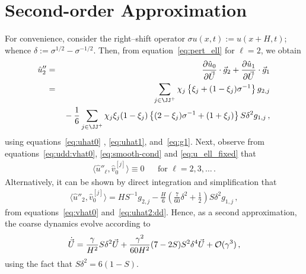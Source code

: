 \documentclass[12pt,a5paper]{article}
\begin{document}
\section{Second-order Approximation}
For convenience, consider the right--shift operator $\sigma u(x,t) := u(x+H,t)$;
 whence $\delta:=\sigma^{{1}/{2}}-\sigma^{-{1}/{2}}$.
Then, from equation~\eqref{eq:pert_ell} for $\ell=2$, we obtain
\begin{eqnarray}
  \hat{u}''_2 & = & \D{\vec U}{\hat{u}_0}\cdot{\vec g}_{2}+\D{\vec U}{\hat{u}_1}\cdot{\vec g}_{1}
\nonumber\\
& = & \sum_{j\in\JJ^+}\chi_j\left\{\xi_j+(1-\xi_j)\sigma^{-1}\right\}g_{2,j}
\nonumber\\
&& {}-\frac{1}{6}\sum_{j\in\JJ^+}\chi_j\xi_j(1-\xi_j)\left\{
(2-\xi_j)\sigma^{-1}+(1+\xi_j)
\right\}S\delta^2g_{1,j}\,,
\label{eq:uhat2:dd}
\end{eqnarray}
using equations~\eqref{eq:uhat0} , \eqref{eq:uhat1}, and~\eqref{eq:g1}.
Next, observe 
from equations~\eqref{eq:udd:vhat0}, \eqref{eq:smooth-cond} and \eqref{eq:u_ell_fixed} that
\begin{eqnarray}
\langle\hat{u}''_\ell,\hat{v}_0^{[j]}\rangle\equiv0 && \mbox{for }\ell=2,3,\ldots\,.
\end{eqnarray}
Alternatively, it can be shown by direct integration and simplification that
\begin{eqnarray}
\langle\hat{u}''_2,\hat{v}_0^{[j]}\rangle = HS^{-1}g_{2,j}-\frac{H}{6}\left(\frac{7}{60}\delta^2+\frac{1}{2}\right)S\delta^2g_{1,j}\,,
\end{eqnarray}
from equations~\eqref{eq:vhat0} and~\eqref{eq:uhat2:dd}.
Hence, as a second approximation, the coarse dynamics evolve according to
\begin{eqnarray}
	\dot{\vec U} = \frac{\gamma}{H^2}S\delta^2\vec U 
+ \frac{\gamma^2}{60H^2}(7-2S)S^2\delta^4\vec U
+ {\cal O}(\gamma^3)\,,
\end{eqnarray}
using the fact that $S\delta^2=6(1-S)$.
\end{document}
